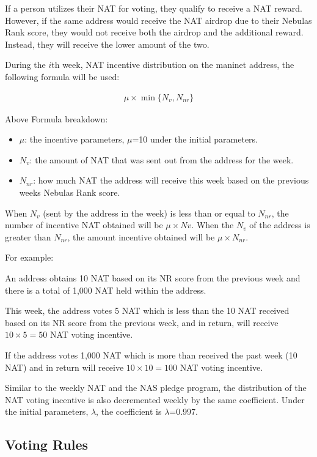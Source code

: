 If a person utilizes their NAT for voting, they qualify to receive a NAT reward. However, if the same address would receive the NAT airdrop due to their Nebulas Rank score, they would not receive both the airdrop and the additional reward. Instead, they will receive the lower amount of the two.
	
During the $i$th week, NAT incentive distribution on the maninet address, the following formula will be used:

\begin{align}
\mu \times \min \{N_{v}, N_{nr}\}
\end{align}

Above Formula breakdown:

\begin{itemize}
	\item $\mu$: the incentive parameters, $\mu$=10 under the initial parameters.
	\item $N_{v}$: the amount of NAT that was sent out from the address for the week.
	\item $N_{nr}$: how much NAT the address will receive this week based on the previous weeks Nebulas Rank score.
\end{itemize}

When $N_{v}$ (sent by the address in the week) is less than or equal to $N_{nr}$, the number of incentive NAT obtained will be $\mu\times Nv$. When the $N_{v}$ of the address is greater than $N_{nr}$, the amount incentive obtained will be $\mu\times N_{nr}$.

For example:

An address obtains 10 NAT based on its NR score from the previous week and there is a total of 1,000 NAT held within the address.

This week, the address votes 5 NAT which is less than the 10 NAT received based on its NR score from the previous week, and in return, will receive $10\times5=50$ NAT voting incentive.

If the address votes 1,000 NAT which is more than received the past week (10 NAT) and in return will receive $10\times10=100$ NAT voting incentive.

Similar to the weekly NAT and the NAS pledge program, the distribution of the NAT voting incentive is also decremented weekly by the same coefficient. Under the initial parameters, $\lambda$, the coefficient is $\lambda$=0.997.

\subsection{Voting Rules}
	
